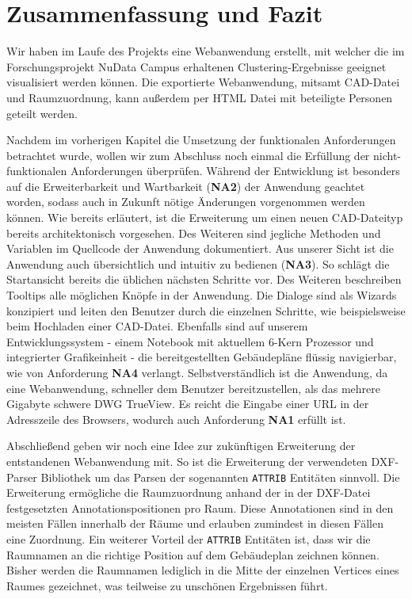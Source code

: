\section{Zusammenfassung und Fazit}
\label{sec:summary}

Wir haben im Laufe des Projekts eine Webanwendung erstellt, mit welcher die im Forschungsprojekt \glqq{}NuData Campus\grqq{} erhaltenen Clustering-Ergebnisse geeignet visualisiert werden können.
Die exportierte Webanwendung, mitsamt CAD-Datei und Raumzuordnung, kann außerdem per HTML Datei mit beteiligte Personen geteilt werden.

Nachdem im vorherigen Kapitel die Umsetzung der funktionalen Anforderungen betrachtet wurde, wollen wir zum Abschluss noch einmal die Erfüllung der nicht-funktionalen Anforderungen überprüfen.
Während der Entwicklung ist besonders auf die Erweiterbarkeit und Wartbarkeit (\textbf{NA2}) der Anwendung geachtet worden, sodass auch in Zukunft nötige Änderungen vorgenommen werden können.
Wie bereits erläutert, ist die Erweiterung um einen neuen CAD-Dateityp bereits architektonisch vorgesehen.
Des Weiteren sind jegliche Methoden und Variablen im Quellcode der Anwendung dokumentiert.
Aus unserer Sicht ist die Anwendung auch übersichtlich und intuitiv zu bedienen (\textbf{NA3}).
So schlägt die Startansicht bereits die üblichen nächsten Schritte vor.
Des Weiteren beschreiben Tooltips alle möglichen Knöpfe in der Anwendung.
Die Dialoge sind als Wizards konzipiert und leiten den Benutzer durch die einzelnen Schritte, wie beispielsweise beim Hochladen einer CAD-Datei.
Ebenfalls sind auf unserem Entwicklungssystem - einem Notebook mit aktuellem 6-Kern Prozessor und integrierter Grafikeinheit - die bereitgestellten Gebäudepläne flüssig navigierbar, wie von Anforderung \textbf{NA4} verlangt.
Selbstverständlich ist die Anwendung, da eine Webanwendung, schneller dem Benutzer bereitzustellen, als das mehrere Gigabyte schwere DWG TrueView.
Es reicht die Eingabe einer URL in der Adresszeile des Browsers, wodurch auch Anforderung \textbf{NA1} erfüllt ist.

Abschließend geben wir noch eine Idee zur zukünftigen Erweiterung der entstandenen Webanwendung mit.
So ist die Erweiterung der verwendeten DXF-Parser Bibliothek um das Parsen der sogenannten \texttt{ATTRIB} Entitäten sinnvoll.
Die Erweiterung ermögliche die Raumzuordnung anhand der in der DXF-Datei festgesetzten Annotationspositionen pro Raum.
Diese Annotationen sind in den meisten Fällen innerhalb der Räume und erlauben zumindest in diesen Fällen eine Zuordnung.
Ein weiterer Vorteil der \texttt{ATTRIB} Entitäten ist, dass wir die Raumnamen an die richtige Position auf dem Gebäudeplan zeichnen können.
Bisher werden die Raumnamen lediglich in die Mitte der einzelnen Vertices eines Raumes gezeichnet, was teilweise zu unschönen Ergebnissen führt.

